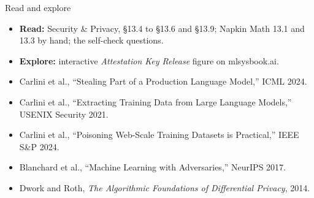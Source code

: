 \documentclass[aspectratio=169, 12pt]{beamer}
\begin{document}
\begin{frame}{Read and explore}
  \small
  \begin{itemize}\setlength{\itemsep}{0.02cm}
    \item \textbf{Read:} Security \& Privacy, \S13.4 to \S13.6 and \S13.9; Napkin Math 13.1 and 13.3 by hand; the self-check questions.
    \item \textbf{Explore:} interactive \emph{Attestation Key Release} figure on mlsysbook.ai.
    \item Carlini et al., ``Stealing Part of a Production Language Model,'' ICML 2024.
    \item Carlini et al., ``Extracting Training Data from Large Language Models,'' USENIX Security 2021.
    \item Carlini et al., ``Poisoning Web-Scale Training Datasets is Practical,'' IEEE S\&P 2024.
    \item Blanchard et al., ``Machine Learning with Adversaries,'' NeurIPS 2017.
    \item Dwork and Roth, \emph{The Algorithmic Foundations of Differential Privacy}, 2014.
  \end{itemize}
\end{frame}
\end{document}
